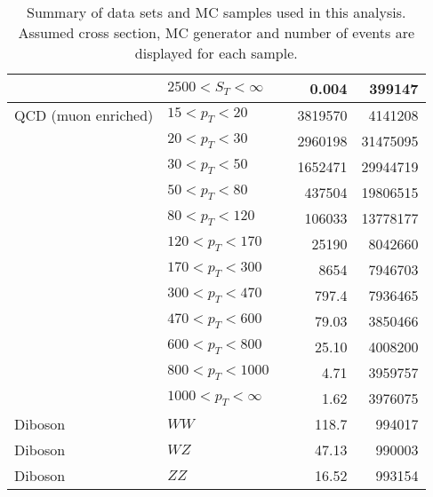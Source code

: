 \begin{landscape}
\begin{table}
\begin{tabular}{l l c r r }
	 	         & $2500 < S_T < \infty$ & & 0.004 & 399147 \\
	 	\hline
	 	QCD (muon enriched) & $15 < p_T < 20$ & & 3819570 & 4141208 \\
		                    & $20 < p_T < 30$ & & 2960198 &  31475095 \\
		                    & $30 < p_T < 50$ & & 1652471 & 29944719\\
		                    & $50 < p_T < 80$ & & 437504& 19806515 \\
		                    & $80 < p_T < 120$ & & 106033 & 13778177 \\
		                    & $120 < p_T < 170$ & & 25190 & 8042660 \\
		                    & $170 < p_T < 300$ & & 8654 & 7946703 \\
		                    & $300 < p_T < 470$ & & 797.4 & 7936465 \\
		                    & $470 < p_T < 600$ & & 79.03 & 3850466 \\
		                    & $600 < p_T < 800$ & & 25.10 & 4008200 \\
		                    & $800 < p_T < 1000$ & & 4.71 & 3959757 \\
		                    & $1000 < p_T < \infty$ & & 1.62 &  3976075 \\
		\hline
	 	Diboson & $WW$ & & 118.7 & 994017 \\
	 	Diboson & $WZ$ & & 47.13 & 990003 \\
	 	Diboson & $ZZ$ & & 16.52 & 993154 \\
	 	 \hline
	 \end{tabular}
	\caption{Summary of data sets and MC samples used in this analysis. Assumed cross section, MC generator and number of events are displayed for each sample.}
	\label{MC_Tab}	
	\end{table}
	\end{landscape}